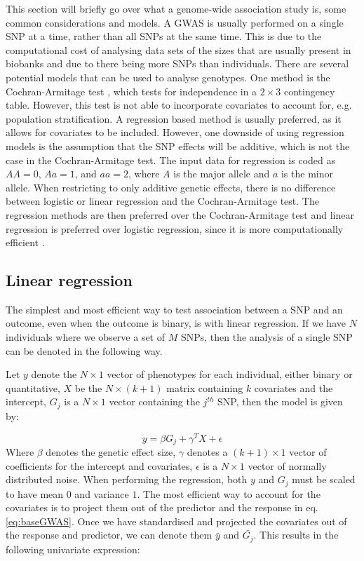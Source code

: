 This section will briefly go over what a genome-wide association study is, some common considerations and models. A GWAS is usually performed on a single SNP at a time, rather than all SNPs at the same time. This is due to the computational cost of analysing data sets of the sizes that are usually present in biobanks and due to there being more SNPs than individuals. There are several potential models that can be used to analyse genotypes. One method is the Cochran-Armitage test \cite{cochran1954some,armitageTest}, which tests for independence in a $ 2\times3 $ contingency table. However, this test is not able to incorporate covariates to account for, e.g. population stratification. A regression based method is usually preferred, as it allows for covariates to be included. However, one downside of using regression models is the assumption that the SNP effects will be additive, which is not the case in the Cochran-Armitage test. The input data for regression is coded as $ AA = 0 $, $ Aa = 1 $, and $ aa = 2 $, where $ A $ is the major allele and $ a $ is the minor allele\cite{zeng2015statistical}. When restricting to only additive genetic effects, there is no difference between logistic or linear regression and the Cochran-Armitage test. The regression methods are then preferred over the Cochran-Armitage test and linear regression is preferred over logistic regression, since it is more computationally efficient \cite{sikorska2013gwas,prive2019making}.


\subsection{Linear regression}
The simplest and most efficient way to test association between a SNP and an outcome, even when the outcome is binary, is with linear regression. If we have $ N $ individuals where we observe a set of $ M $ SNPs, then the analysis of a single SNP can be denoted in the following way.

Let $ y $ denote the $ N\times1 $ vector of phenotypes for each individual, either binary or quantitative, $ X $ be the $ N \times (k+1) $ matrix containing $ k $ covariates and the intercept, $ G_j $ is a $ N\times 1 $ vector containing the $ j^{th} $ SNP, then the model is given by:

\begin{equation}\label{eq:baseGWAS}
y = \beta G_{j} + \gamma^{T} X + \epsilon
\end{equation}
Where $ \beta $ denotes the genetic effect size, $ \gamma $ denotes a $ (k + 1) \times 1$ vector of coefficients for the intercept and covariates, $ \epsilon $ is a $ N \times 1 $ vector of normally distributed noise. When performing the regression, both $ y $ and $ G_j $ must be scaled to have mean $ 0 $ and variance $ 1 $. The most efficient way to account for the covariates is to project them out of the predictor and the response in eq. \eqref{eq:baseGWAS}. Once we have standardised and projected the covariates out of the response and predictor, we can denote them $ \bar{y} $ and $ \bar{G_j} $. This results in the following univariate expression:


